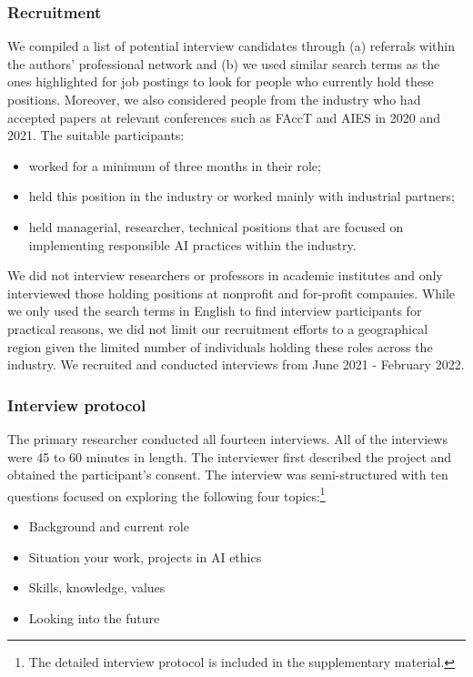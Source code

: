 \documentclass[sigconf]{acmart}
\begin{document}
\subsubsection{Recruitment}
We compiled a list of potential interview candidates through (a) referrals within the authors' professional network and (b) we used similar search terms as the ones highlighted for job postings to look for people who currently hold these positions. Moreover, we also considered people from the industry who had accepted papers at relevant conferences such as FAccT and AIES in 2020 and 2021. The suitable participants:
\begin{itemize}
    \item worked for a minimum of three months in their role; 
    \item held this position in the industry or worked mainly with industrial partners;
    \item held managerial, researcher, technical positions that are focused on implementing responsible \ac{AI} practices within the industry. 
\end{itemize}

We did not interview researchers or professors in academic institutes and only interviewed those holding positions at nonprofit and for-profit companies. While we only used the search terms in English to find interview participants for practical reasons, we did not limit our recruitment efforts to a geographical region given the limited number of individuals holding these roles across the industry. We recruited and conducted interviews from June 2021 - February 2022. 

\subsubsection{Interview protocol}
The primary researcher conducted all fourteen interviews. All of the interviews were 45 to 60 minutes in length. The interviewer first described the project and obtained the participant's consent. The interview was semi-structured with ten questions focused on exploring the following four topics:\footnote{The detailed interview protocol is included in the supplementary material.} 
\begin{itemize}
    \item Background and current role
    \item Situation your work, projects in \ac{AI} ethics
    \item Skills, knowledge, values
    \item Looking into the future 
\end{itemize}
\end{document}
